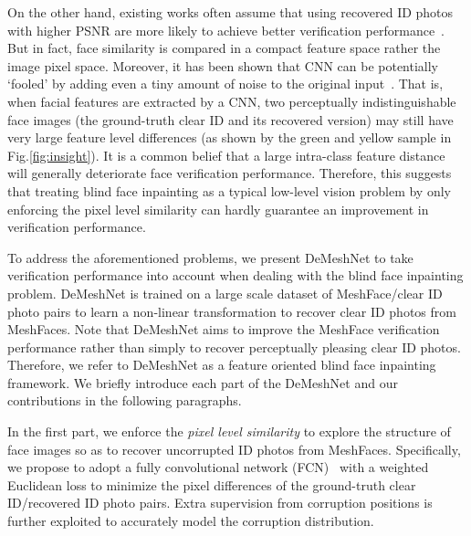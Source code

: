 \documentclass[10pt,twocolumn,letterpaper]{article}
\begin{document}
On the other hand, existing works often assume that using recovered ID photos with higher PSNR are more likely to achieve better verification performance~\cite{7550058}. But in fact, face similarity is compared in a compact feature space rather the image pixel space. Moreover, it has been shown that CNN can be potentially `fooled' by adding even a tiny amount of noise to the original input~\cite{goodfellow2014explaining,nguyen2015deep,szegedy2013intriguing}. That is, when facial features are extracted by a CNN, two perceptually indistinguishable face images (\eg the ground-truth clear ID and its recovered version) may still have very large feature level differences (as shown by the green and yellow sample in Fig.\ref{fig:insight}). It is a common belief that a large intra-class feature distance will generally deteriorate face verification performance. Therefore, this suggests that treating blind face inpainting as a typical low-level vision problem by only enforcing the pixel level similarity can hardly guarantee an improvement in verification performance.



To address the aforementioned problems, we present DeMeshNet to take verification performance into account when dealing with the blind face inpainting problem. DeMeshNet is trained on a large scale dataset of  MeshFace/clear ID photo pairs to learn a non-linear transformation to recover clear ID photos from MeshFaces. Note that DeMeshNet aims to improve the MeshFace verification performance rather than simply to recover perceptually pleasing clear ID photos. Therefore, we refer to DeMeshNet as a feature oriented blind face inpainting framework. We briefly introduce each part of the DeMeshNet and our contributions in the following paragraphs.







In the first part, we enforce the \textit{pixel level similarity} to explore the structure of face images so as to recover uncorrupted ID photos from MeshFaces. Specifically, we propose to adopt a fully convolutional network (FCN)~\cite{long2015fully} with a weighted Euclidean loss to minimize the pixel differences of the ground-truth clear ID/recovered ID photo pairs. Extra supervision from corruption positions is further exploited to accurately model the corruption distribution.
\end{document}
